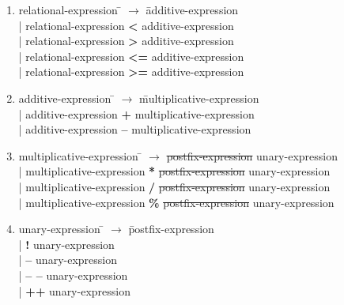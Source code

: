 \documentclass[12pt]{article}
\begin{document}
\begin{enumerate}
\item \begin{tabbing} relational-expression \= $\rightarrow$ \= additive-expression \\
	\> \hspace*{0.05cm} | \> relational-expression \textbf{<}   additive-expression \\
	\> \hspace*{0.05cm} | \> relational-expression \textbf{>}   additive-expression \\
	\> \hspace*{0.05cm} | \> relational-expression \textbf{<=} additive-expression \\
	\> \hspace*{0.05cm} | \> relational-expression \textbf{>=} additive-expression \\
\end{tabbing}

\item \begin{tabbing} additive-expression \= $\rightarrow$ \= multiplicative-expression \\
	\> \hspace*{0.05cm} | \> additive-expression \textbf{+} multiplicative-expression \\
	\> \hspace*{0.05cm} | \> additive-expression \textbf{--} multiplicative-expression \\
\end{tabbing}

\item \begin{tabbing} multiplicative-expression \= $\rightarrow$ \= \sout{postfix-expression} unary-expression \\
	\> \hspace*{0.05cm} | \> multiplicative-expression \textbf{*}   \sout{postfix-expression} unary-expression \\
	\> \hspace*{0.05cm} | \> multiplicative-expression \textbf{/}   \sout{postfix-expression} unary-expression \\
	\> \hspace*{0.05cm} | \> multiplicative-expression \textbf{\%}  \sout{postfix-expression} unary-expression \\
\end{tabbing}

\item \begin{tabbing} unary-expression \= $\rightarrow$ \= postfix-expression \\
	\> \hspace*{0.05cm} | \>  \textbf{!}   unary-expression \\
	\> \hspace*{0.05cm} | \>  \textbf{--}   unary-expression \\
	\> \hspace*{0.05cm} | \>  \textbf{-- --}  unary-expression \\
	\> \hspace*{0.05cm} | \>  \textbf{++}  unary-expression \\
\end{tabbing}


\end{enumerate}
\end{document}
